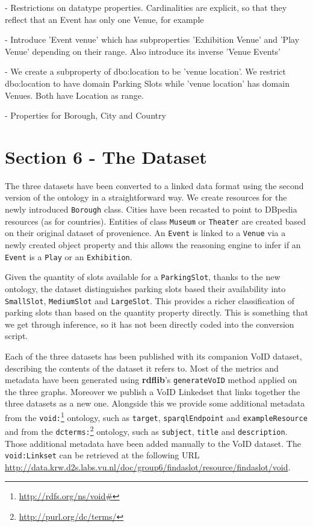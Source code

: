 \documentclass[runningheads,a4paper]{../../StyleFiles/llncs}
\begin{document}
- Restrictions on datatype properties. Cardinalities are explicit, so that they reflect that an Event has only one Venue, for example

- Introduce 'Event venue' which has subproperties 'Exhibition Venue' and 'Play Venue' depending on their range. Also introduce its inverse 'Venue Events'

- We create a subproperty of dbo:location to be 'venue location'. We restrict dbo:location to have domain Parking Slots while 'venue location' has domain Venues. Both have Location as range.

- Properties for Borough, City and Country


\section{Section 6 - The Dataset}
The three datasets have been converted to a linked data format using the second
version of the ontology in a straightforward way. We create
resources for the newly introduced \texttt{Borough} class. Cities have been
recasted to point to DBpedia resources (as for countries).
Entities of class \texttt{Museum} or \texttt{Theater} are created based on their
original dataset of provenience. An \texttt{Event} is linked to a
\texttt{Venue} via a newly created object property and this allows the reasoning
engine to infer if an \texttt{Event} is a \texttt{Play} or an \texttt{Exhibition}.

Given the quantity of slots available for a \texttt{ParkingSlot}, thanks to the
new ontology, the dataset distinguishes parking slots based their availability
into \texttt{SmallSlot}, \texttt{MediumSlot} and \texttt{LargeSlot}. This
provides a richer classification of parking slots than based on the quantity
property directly. This is something that we get through inference, so it has
not been directly coded into the conversion script.

Each of the three datasets has been published with its companion VoID dataset,
describing the contents of the dataset it refers to. Most of the metrics and
metadata have been generated using \textbf{rdflib}'s \texttt{generateVoID}
method applied on the three graphs.
Moreover we publish a VoID Linkedset that links together the three datasets as a
new one. Alongside this we provide some additional metadata from the
\texttt{void:}\footnote{\url{http://rdfs.org/ns/void#}} ontology, such as
\texttt{target}, \texttt{sparqlEndpoint} and
\texttt{exampleResource} and from the
\texttt{dcterms:}\footnote{\url{http://purl.org/dc/terms/}} ontology, such as
\texttt{subject}, \texttt{title} and
\texttt{description}. Those additional metadata have been added manually
to the VoID dataset. The \texttt{void:Linkset} can be retrieved at the following
URL \url{http://data.krw.d2s.labs.vu.nl/doc/group6/findaslot/resource/findaslot/void}.
\end{document}
